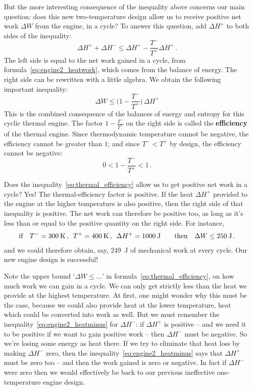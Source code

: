 \documentclass[a4paper,12pt,%
onecolumn,oneside,%
british%
]{memoir}
\newcommand*{\incr}{\Delta}%
\renewcommand*{\|}[1][]{\nonscript\:#1\vert\nonscript\:\mathopen{}}
\newcommand*{\yhep}{\incr H^{+}}%
\newcommand*{\yhem}{\incr H^{-}}%
\newcommand*{\yW}{\incr W}%
\newcommand*{\yT}{T}%
\newcommand*{\yTp}{\yT^{+}}%
\newcommand*{\yTm}{\yT^{-}}%
\begin{document}
But the more interesting consequence of the inequality above concerns our main question: does this new two-temperature design allow us to receive positive net work $\yW$ from the engine, in a cycle? To answer this question, add $\yhep$ to both sides of the inequality:
\begin{equation*}
  \yhep + \yhem \le \yhep -\frac{\yTm}{\yTp}\yhep \,.
\end{equation*}
The left side is equal to the net work gained in a cycle, from formula~\eqref{eq:engine2_heatwork}, which comes from the balance of energy. The right side can be rewritten with a little algebra. We obtain the following important inequality:
\begin{equation}\label{eq:thermal_efficiency}
  \yW \le \biggl(1-\frac{\yTm}{\yTp}\biggr)\,\yhep
\end{equation}
This is the combined consequence of the balances of energy and entropy for this cyclic thermal engine. The factor $1-\frac{\yTm}{\yTp}$ on the right side is called the \textbf{efficiency} of the thermal engine. Since thermodynamic temperature cannot be negative, the efficiency cannot be greater than $1$; and since $\yTm < \yTp$ by design, the efficiency cannot be negative:
\begin{equation*}
  0 < 1-\frac{\yTm}{\yTp} < 1 \,.
\end{equation*}

Does the inequality~\eqref{eq:thermal_efficiency} allow us to get positive net work in a cycle? Yes! The thermal-efficiency factor is positive. If the heat $\yhep$ provided to the engine at the higher temperature is also positive, then the right side of that inequality is positive. The net work can therefore be positive too, as long as it's less than or equal to the positive quantity on the right side. For instance,
\begin{equation*}
  \text{if}\quad
  \yTm = \qty{300}{K}\,,\enskip
  \yTp = \qty{400}{K}\,,\enskip
  \yhep = \qty{1000}{J}
  \qquad
  \text{then}\quad
  \yW \le \qty{250}{J} \,.
\end{equation*}
and we could therefore obtain, say, \qty{249}{J} of mechanical work at every cycle. Our new engine design is successful!

Note the upper bound \enquote*{$\yW \le \dotso$} in formula~\eqref{eq:thermal_efficiency}, on how much work we can gain in a cycle. We can only get strictly less than the heat we provide at the highest temperature. At first, one might wonder why this must be the case, because we could also provide heat at the lower temperature, heat which could be converted into work as well. But we must remember the inequality~\eqref{eq:engine2_heatminus} for $\yhem$: if $\yhep$ is positive -- and we need it to be positive if we want to gain positive work -- then $\yhem$ must be negative. So we're losing some energy as heat there. If we try to eliminate that heat loss by making $\yhem$ zero, then the inequality~\eqref{eq:engine2_heatminus} says that $\yhep$ must be zero too -- and then the work gained is zero or negative. In fact if $\yhem$ were zero then we would effectively be back to our previous ineffective one-temperature engine design.
\end{document}
